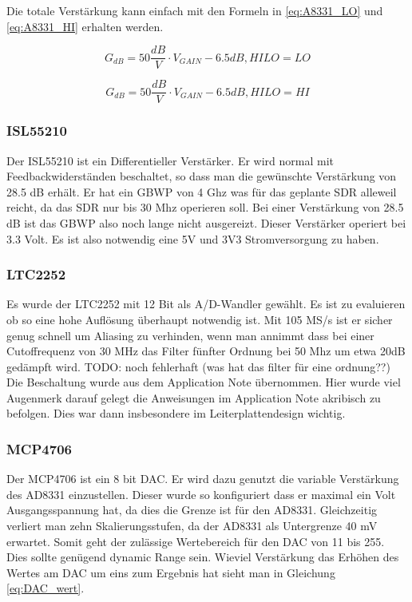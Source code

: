 Die totale Verstärkung kann einfach mit den Formeln in \ref{eq:A8331_LO} und \ref{eq:A8331_HI} erhalten werden.

\begin{equation}
    G_{dB} = 50 \frac{dB}{V} \cdot V_{GAIN} - 6.5 dB, HILO = LO
\label{eq:A8331_LO}
\end{equation}

\begin{equation}
    G_{dB} = 50 \frac{dB}{V} \cdot V_{GAIN} - 6.5 dB, HILO = HI
\label{eq:A8331_HI}
\end{equation}

\subsubsection{ISL55210}
Der ISL55210 ist ein Differentieller Verstärker. Er wird normal mit Feedbackwiderständen beschaltet, so dass man die gewünschte Verstärkung von 28.5 dB erhält.
Er hat ein GBWP von 4 Ghz was für das geplante SDR alleweil reicht, da das SDR nur bis 30 Mhz operieren soll. Bei einer Verstärkung von 28.5 dB ist das GBWP also noch lange nicht ausgereizt.
Dieser Verstärker operiert bei 3.3 Volt. Es ist also notwendig eine 5V und 3V3 Stromversorgung zu haben.

\subsubsection{LTC2252}
Es wurde der LTC2252 mit 12 Bit als A/D-Wandler gewählt. Es ist zu evaluieren ob so eine hohe Auflösung überhaupt notwendig ist.
Mit 105 MS/s ist er sicher genug schnell um Aliasing zu verhinden, wenn man annimmt dass bei einer Cutoffrequenz von 30 MHz das Filter fünfter Ordnung bei 50 Mhz um etwa 20dB gedämpft wird. TODO: noch fehlerhaft (was hat das filter für eine ordnung??)
Die Beschaltung wurde aus dem Application Note übernommen. Hier wurde viel Augenmerk darauf gelegt die Anweisungen im Application Note akribisch zu befolgen. Dies war dann insbesondere im Leiterplattendesign wichtig.

\subsubsection{MCP4706}
\label{subsec:MCP4706}
Der MCP4706 ist ein 8 bit DAC. Er wird dazu genutzt die variable Verstärkung des AD8331 einzustellen. Dieser wurde so konfiguriert dass er maximal ein Volt Ausgangsspannung hat, da dies die Grenze ist für den AD8331. Gleichzeitig verliert man zehn Skalierungsstufen, da der AD8331 als Untergrenze 40 mV erwartet. Somit geht der zulässige Wertebereich für den DAC von 11 bis 255. Dies sollte genügend dynamic Range sein. Wieviel Verstärkung das Erhöhen des Wertes am DAC um eins zum Ergebnis hat sieht man in Gleichung \ref{eq:DAC_wert}.

